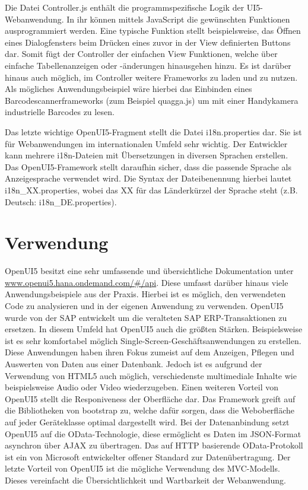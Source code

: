 Die Datei Controller.js enthält die programmspezifische Logik der UI5-Webanwendung. In ihr können mittels JavaScript die gewünschten Funktionen ausprogrammiert werden. Eine typische Funktion stellt beispielsweise, das Öffnen eines Dialogfensters beim Drücken eines zuvor in der View definierten Buttons dar. Somit fügt der Controller der einfachen View Funktionen, welche über einfache Tabellenanzeigen oder -änderungen hinausgehen hinzu. Es ist darüber hinaus auch möglich, im Controller weitere Frameworks zu laden und zu nutzen. Als mögliches Anwendungsbeispiel wäre hierbei das Einbinden eines Barcodescannerframeworks (zum Beispiel quagga.js) um mit einer Handykamera industrielle Barcodes zu lesen.

Das letzte wichtige OpenUI5-Fragment stellt die Datei i18n.properties dar. Sie ist für Webanwendungen im internationalen Umfeld sehr wichtig. Der Entwickler kann mehrere i18n-Dateien mit Übersetzungen in diversen Sprachen erstellen. Das OpenUI5-Framework stellt daraufhin sicher, dass die passende Sprache als Anzeigesprache verwendet wird. Die Syntax der Dateibenennung hierbei lautet i18n\_XX.properties, wobei das XX für das Länderkürzel der Sprache steht (z.B. Deutsch: i18n\_DE.properties).


\section{Verwendung}

OpenUI5 besitzt eine sehr umfassende und übersichtliche Dokumentation unter \url{www.openui5.hana.ondemand.com/#/api}. Diese umfasst darüber hinaus viele Anwendungsbeispiele aus der Praxis. Hierbei ist es möglich, den verwendeten Code zu analysieren und in der eigenen Anwendung zu verwenden. OpenUI5 wurde von der SAP entwickelt um die veralteten SAP ERP-Transaktionen zu ersetzen. In diesem Umfeld hat OpenUI5 auch die größten Stärken. Beispielsweise ist es sehr komfortabel möglich Single-Screen-Geschäftsanwendungen zu erstellen. Diese Anwendungen haben ihren Fokus zumeist auf dem Anzeigen, Pflegen und Auswerten von Daten aus einer Datenbank. Jedoch ist es aufgrund der Verwendung von HTML5 auch möglich, verschiedenste multimediale Inhalte wie beispielsweise Audio oder Video wiederzugeben. Einen weiteren Vorteil von OpenUI5 stellt die Responiveness der Oberfläche dar. Das Framework greift auf die Bibliotheken von bootstrap zu, welche dafür sorgen, dass die Weboberfläche auf jeder Geräteklasse optimal dargestellt wird. Bei der Datenanbindung setzt OpenUI5 auf die OData-Technologie, diese ermöglicht es Daten im JSON-Format asynchron über AJAX zu übertragen. Das auf HTTP basierende OData-Protokoll ist ein von Microsoft entwickelter offener Standard zur Datenübertragung. Der letzte Vorteil von OpenUI5 ist die mögliche Verwendung des MVC-Modells. Dieses vereinfacht die Übersichtlichkeit und Wartbarkeit der Webanwendung. 
